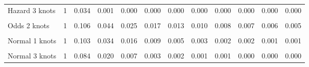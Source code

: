 \documentclass[
]{article}
\begin{document}
\begin{table}[H]
{\begin{tabular}[t]{lrrrrrrrrrrr}
Hazard 3 knots & 1 & 0.034 & 0.001 & 0.000 & 0.000 & 0.000 & 0.000 & 0.000 & 0.000 & 0.000 & 0.000\\
\cellcolor{gray!10}{Odds 1 knots} & \cellcolor{gray!10}{1} & \cellcolor{gray!10}{0.115} & \cellcolor{gray!10}{0.052} & \cellcolor{gray!10}{0.032} & \cellcolor{gray!10}{0.023} & \cellcolor{gray!10}{0.017} & \cellcolor{gray!10}{0.014} & \cellcolor{gray!10}{0.012} & \cellcolor{gray!10}{0.010} & \cellcolor{gray!10}{0.009} & \cellcolor{gray!10}{0.008}\\
Odds 2 knots & 1 & 0.106 & 0.044 & 0.025 & 0.017 & 0.013 & 0.010 & 0.008 & 0.007 & 0.006 & 0.005\\
\cellcolor{gray!10}{Odds 3 knots} & \cellcolor{gray!10}{1} & \cellcolor{gray!10}{0.094} & \cellcolor{gray!10}{0.033} & \cellcolor{gray!10}{0.018} & \cellcolor{gray!10}{0.011} & \cellcolor{gray!10}{0.008} & \cellcolor{gray!10}{0.006} & \cellcolor{gray!10}{0.005} & \cellcolor{gray!10}{0.004} & \cellcolor{gray!10}{0.003} & \cellcolor{gray!10}{0.003}\\
Normal 1 knots & 1 & 0.103 & 0.034 & 0.016 & 0.009 & 0.005 & 0.003 & 0.002 & 0.002 & 0.001 & 0.001\\
\cellcolor{gray!10}{Normal 2 knots} & \cellcolor{gray!10}{1} & \cellcolor{gray!10}{0.101} & \cellcolor{gray!10}{0.033} & \cellcolor{gray!10}{0.015} & \cellcolor{gray!10}{0.008} & \cellcolor{gray!10}{0.005} & \cellcolor{gray!10}{0.003} & \cellcolor{gray!10}{0.002} & \cellcolor{gray!10}{0.001} & \cellcolor{gray!10}{0.001} & \cellcolor{gray!10}{0.001}\\
Normal 3 knots & 1 & 0.084 & 0.020 & 0.007 & 0.003 & 0.002 & 0.001 & 0.001 & 0.000 & 0.000 & 0.000\\
\bottomrule
\end{tabular}}
\end{table}
\end{document}
